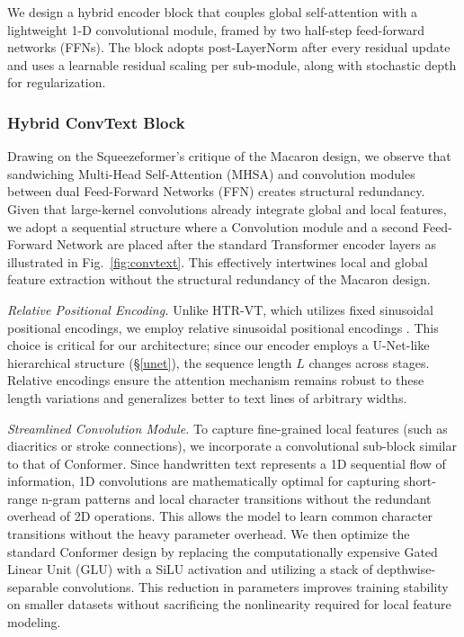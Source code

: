 \documentclass[final,5p,times]{elsarticle}
\begin{document}
We design a hybrid encoder block that couples global self-attention with a lightweight 1-D convolutional module, framed by two half-step feed-forward networks (FFNs). The block adopts post-LayerNorm after every residual update and uses a learnable residual scaling per sub-module, along with stochastic depth for regularization.

\subsubsection{Hybrid ConvText Block}

Drawing on the Squeezeformer's critique of the Macaron design, we observe that sandwiching Multi-Head Self-Attention (MHSA) and convolution modules between dual Feed-Forward Networks (FFN) creates structural redundancy. Given that large-kernel convolutions already integrate global and local features, we adopt a sequential structure where a Convolution module and a second Feed-Forward Network are placed after the standard Transformer encoder layers as illustrated in Fig.~\ref{fig:convtext}. This effectively intertwines local and global feature extraction without the structural redundancy of the Macaron design.

\textit{Relative Positional Encoding.} Unlike HTR-VT, which utilizes fixed sinusoidal positional encodings, we employ relative sinusoidal positional encodings \cite{dai2019transformerxl}. This choice is critical for our architecture; since our encoder employs a U-Net-like hierarchical structure (\S\ref{unet}), the sequence length $L$ changes across stages. Relative encodings ensure the attention mechanism remains robust to these length variations and generalizes better to text lines of arbitrary widths.

\textit{Streamlined Convolution Module.} To capture fine-grained local features (such as diacritics or stroke connections), we incorporate a convolutional sub-block similar to that of Conformer. Since handwritten text represents a 1D sequential flow of information, 1D convolutions are mathematically optimal for capturing short-range n-gram patterns and local character transitions without the redundant overhead of 2D operations. This allows the model to learn common character transitions without the heavy parameter overhead. We then optimize the standard Conformer design by replacing the computationally expensive Gated Linear Unit (GLU) with a SiLU activation and utilizing a stack of depthwise-separable convolutions. This reduction in parameters improves training stability on smaller datasets without sacrificing the nonlinearity required for local feature modeling.
\end{document}
